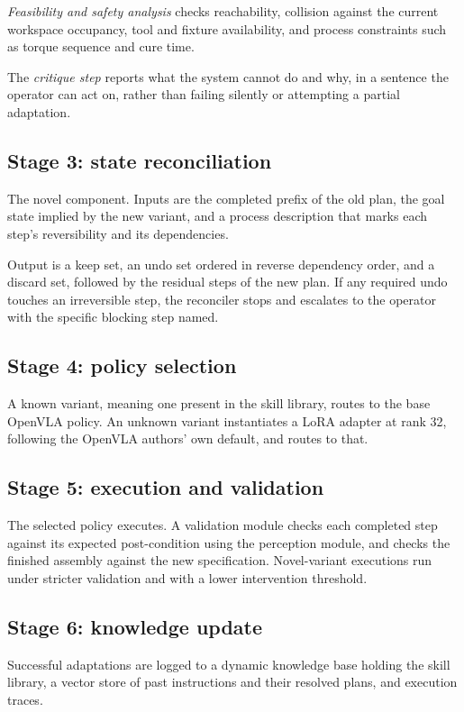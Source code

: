 \documentclass[conference]{IEEEtran}
\begin{document}
\emph{Feasibility and safety analysis} checks reachability, collision
against the current workspace occupancy, tool and fixture availability,
and process constraints such as torque sequence and cure time.

The \emph{critique step} reports what the system cannot do and why, in a
sentence the operator can act on, rather than failing silently or
attempting a partial adaptation.

\subsection{Stage 3: state reconciliation}

The novel component. Inputs are the completed prefix of the old plan, the
goal state implied by the new variant, and a process description that
marks each step's reversibility and its dependencies.

Output is a keep set, an undo set ordered in reverse dependency order,
and a discard set, followed by the residual steps of the new plan. If any
required undo touches an irreversible step, the reconciler stops and
escalates to the operator with the specific blocking step named.

\subsection{Stage 4: policy selection}

A known variant, meaning one present in the skill library, routes to the
base OpenVLA policy. An unknown variant instantiates a LoRA adapter at
rank 32, following the OpenVLA authors' own default, and routes to that.

\subsection{Stage 5: execution and validation}

The selected policy executes. A validation module checks each completed
step against its expected post-condition using the perception module, and
checks the finished assembly against the new specification. Novel-variant
executions run under stricter validation and with a lower intervention
threshold.

\subsection{Stage 6: knowledge update}

Successful adaptations are logged to a dynamic knowledge base holding the
skill library, a vector store of past instructions and their resolved
plans, and execution traces.
\end{document}

